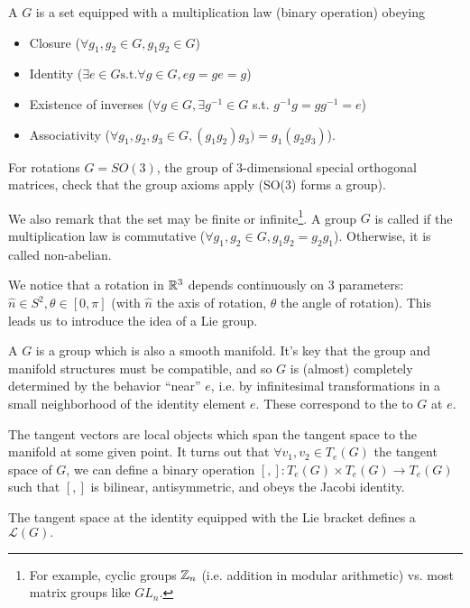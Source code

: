 \begin{defn}
A  $G$ is a set equipped with a multiplication law (binary operation) obeying
\begin{itemize}
    \item Closure ($\forall g_1, g_2\in G, g_1g_2 \in G$)
    \item Identity ($\exists e\in G \text{s.t.} \forall g\in G, eg = ge = g$)
    \item Existence of inverses ($\forall g \in G, \exists g^{-1} \in G$ s.t. $g^{-1}g=gg^{-1}=e$)
    \item Associativity ($\forall g_1,g_2,g_3\in G, (g_1g_2)g_3)=g_1(g_2g_3)$).
\end{itemize}
\end{defn}
\begin{ex}
 For rotations $G=SO(3)$, the group of 3-dimensional special orthogonal matrices, check that the group axioms apply (SO(3) forms a group).
\end{ex}

We also remark that the set may be finite or infinite\footnote{For example, cyclic groups $\mathbb{Z}_n$ (i.e. addition in modular arithmetic) vs. most matrix groups like $GL_n$.}. A group $G$ is called  if the multiplication law is commutative ($\forall g_1,g_2\in G, g_1g_2=g_2g_1$). Otherwise, it is called non-abelian.

We notice that a rotation in $\mathbb{R}^3$ depends continuously on 3 parameters: $\hat n\in S^2, \theta \in[0,\pi]$ (with $\hat n$ the axis of rotation, $\theta$ the angle of rotation). This leads us to introduce the idea of a Lie group.
\begin{defn}
A  $G$ is a group which is also a smooth manifold. It's key that the group and manifold structures must be compatible, and so $G$ is (almost) completely determined by the behavior ``near'' $e$, i.e. by infinitesimal transformations in a small neighborhood of the identity element $e$. These correspond to the  to $G$ at $e$.
\end{defn}

The tangent vectors are local objects which span the tangent space to the manifold at some given point. It turns out that $\forall v_1,v_2\in T_e(G)$ the tangent space of $G$, we can define a binary operation $[,]:T_e(G)\times T_e(G) \to T_e(G)$ such that $[,]$ is bilinear, antisymmetric, and obeys the Jacobi identity. 
\begin{defn}
The tangent space at the identity equipped with the Lie bracket defines a  $\mathcal{L}(G).$
\end{defn}

